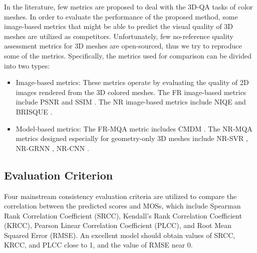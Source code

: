 \documentclass[lettersize,journal]{IEEEtran}
\begin{document}
In the literature, few metrics are proposed to deal with the 3D-QA tasks of color meshes. In order to evaluate the performance of the proposed method, some image-based metrics that might be able to predict the visual quality of 3D meshes are utilized as competitors. Unfortunately, few no-reference quality assessment metrics for 3D meshes are open-sourced, thus we try to reproduce some of the metrics. Specifically, the metrics used for comparison can be divided into two types: 
\begin{itemize}
    \item  Image-based metrics: These metrics operate by evaluating the quality of 2D images rendered from the 3D colored meshes. The FR image-based metrics include PSNR and SSIM \cite{ssim}. The NR image-based metrics include NIQE \cite{niqe} and BRISQUE \cite{brisque}.
    \item Model-based metrics: The FR-MQA metric includes CMDM \cite{database}. The NR-MQA metrics designed especially for geometry-only 3D meshes include NR-SVR \cite{nr-svr}, NR-GRNN \cite{nr-grnn}, NR-CNN \cite{nr-cnn}.
\end{itemize}



\subsection{Evaluation Criterion}
Four mainstream consistency evaluation criteria are utilized to compare the correlation between the predicted scores and MOSs, which include Spearman Rank Correlation Coefficient (SRCC), Kendall’s Rank Correlation Coefficient (KRCC), Pearson Linear Correlation Coefficient (PLCC), and Root Mean Squared Error (RMSE).
An excellent model should obtain values of SRCC, KRCC, and PLCC close to 1, and the value of RMSE near 0. 
\end{document}
